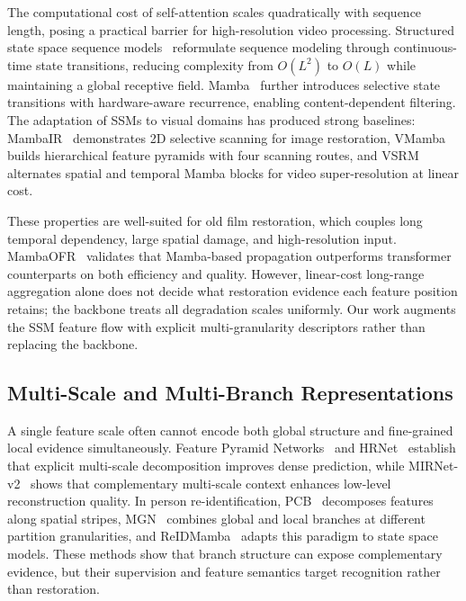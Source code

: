\documentclass[symmetry,article,submit,pdftex,moreauthors]{Definitions/mdpi}
\begin{document}
The computational cost of self-attention scales quadratically with sequence length, posing a practical barrier for high-resolution video processing. Structured state space sequence models~\cite{gu2022s4} reformulate sequence modeling through continuous-time state transitions, reducing complexity from $O(L^2)$ to $O(L)$ while maintaining a global receptive field. Mamba~\cite{gu2024mamba} further introduces selective state transitions with hardware-aware recurrence, enabling content-dependent filtering. The adaptation of SSMs to visual domains has produced strong baselines: MambaIR~\cite{guo2024mambair} demonstrates 2D selective scanning for image restoration, VMamba~\cite{liu2024vmamba} builds hierarchical feature pyramids with four scanning routes, and VSRM~\cite{tran2025vsrm} alternates spatial and temporal Mamba blocks for video super-resolution at linear cost.

These properties are well-suited for old film restoration, which couples long temporal dependency, large spatial damage, and high-resolution input. MambaOFR~\cite{mao2025mambaofr} validates that Mamba-based propagation outperforms transformer counterparts on both efficiency and quality. However, linear-cost long-range aggregation alone does not decide what restoration evidence each feature position retains; the backbone treats all degradation scales uniformly. Our work augments the SSM feature flow with explicit multi-granularity descriptors rather than replacing the backbone.

\subsection{Multi-Scale and Multi-Branch Representations}
\label{subsec:multigran}

A single feature scale often cannot encode both global structure and fine-grained local evidence simultaneously. Feature Pyramid Networks~\cite{lin2017fpn} and HRNet~\cite{wang2021hrnet} establish that explicit multi-scale decomposition improves dense prediction, while MIRNet-v2~\cite{zamir2022mirnetv2} shows that complementary multi-scale context enhances low-level reconstruction quality. In person re-identification, PCB~\cite{sun2018pcb} decomposes features along spatial stripes, MGN~\cite{wang2018mgn} combines global and local branches at different partition granularities, and ReIDMamba~\cite{gu2025reidmamba} adapts this paradigm to state space models. These methods show that branch structure can expose complementary evidence, but their supervision and feature semantics target recognition rather than restoration.
\end{document}
